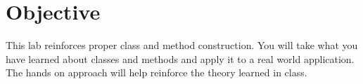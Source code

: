 \section{Objective}

This lab reinforces proper class and method construction. 
You will take what you have learned about classes and methods and apply it to a real world application. 
The hands on approach will help reinforce the theory learned in class.
